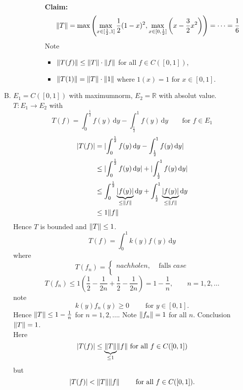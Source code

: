 \begin{beispiele}
\begin{enumerate}[(A)]
\begin{beweis}
\begin{enumerate}[(1)]
\begin{description}
\begin{align*}
				\end{align*}
				\textbf{Claim:} \text{    }   
				\[
					\norm{T} = \max \left( \max\limits_{x \in [\frac{1}{2},1]} \frac{1}{2}(1-x)^2 , \max\limits_{x \in [0,\frac{1}{2}]}\left( x - \frac{3}{2}x^2
					 \right) \right) = 
					\dots = \frac{1}{6}
				\]
				Note 
				\begin{itemize}
					\item $\norm{T(f)}\leq \norm{T} \cdot \norm{f}$ for all $f \in C([0,1])$,
					\item $\norm{T(1)} = \norm{T} \cdot \norm{1}$ where $1(x)=1$ for $x \in [0,1]$.
				\end{itemize}
			\end{description}
		\end{enumerate}
	\end{beweis}
	\item $E_1 = C([0,1])$ with maximumnorm, $E_2 = \mathbb{R}$ with absolut value. $T: E_1 \to E_2$ with
	\[
		T(f) = \int_{0}^{\frac{1}{2}}f(y) \,\mathrm{d}y - \int_{\frac{1}{2}}^{1} f(y) \,\mathrm{d}y \qquad \text{for }f \in E_1
	\]
	\begin{align*}
		\abs{T(f)} &= \abs{\int_{0}^{\frac{1}{2}}f(y) \,\mathrm{d}y - \int_{\frac{1}{2}}^{1} f(y) \,\mathrm{d}y} \\
		&\leq \abs{\int_{0}^{\frac{1}{2}}f(y) \,\mathrm{d}y} + \abs{\int_{\frac{1}{2}}^{1} f(y) \,\mathrm{d}y} \\
		&\leq \int_{0}^{\frac{1}{2}}\underset{\leq \norm{f}}{\underbrace{\abs{f(y)}}} \,\mathrm{d}y 
		+ \int_{\frac{1}{2}}^{1} \underset{\leq \norm{f}}{\underbrace{\abs{f(y)}}} \,\mathrm{d}y \\
		&\leq 1 \norm{f}
	\end{align*}
	Hence $T$ is bounded and $\norm{T}\leq 1$.
	\[
		T(f) = \int_{0}^{1}k(y)f(y) \,\mathrm{d}y 
	\]
	where 
	\[
		T(f_n)= \begin{cases}
			nachholen, &\text{ falls }case\\
			
		\end{cases}
	\]
	\[
		T(f_n) \leq 1 \left( \frac{1}{2} - \frac{1}{2n} + \frac{1}{2} - \frac{1}{2n} \right) = 1 - \frac{1}{n}, \qquad  n=1,2,\dots
	\]
	note
	\[
		k(y)f_n(y) \geq 0 \qquad \text{ for } y \in [0,1].
	\]
	Hence $\norm{T} \leq 1- \frac{1}{n}$ for $n =1,2,\dots$. Note $\norm{f_n}=1$ for all $n$. Conclusion $\norm{T}=1$. \\
	Here
	\[
		\abs{T(f)} \leq \underset{\leq 1}{\underbrace{\norm{T}}} \norm{f} \text{ for all }f \in C([0,1])
	\]
	but
	\[
		\abs{T(f)} < \norm{T} \norm{f} \qquad \text{ for all }f \in C([0,1]).
	\]
	\end{enumerate}
\end{beispiele}
